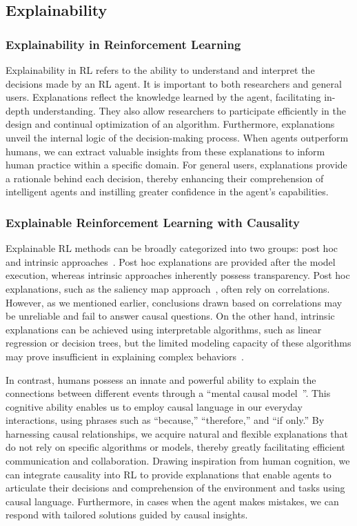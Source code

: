 \documentclass[10pt]{article} %
\theoremstyle{definition}
\begin{document}
\subsection{Explainability}
\subsubsection{Explainability in Reinforcement Learning}
Explainability in RL refers to the ability to understand and interpret the decisions made by an RL agent. It is important to both researchers and general users. Explanations reflect the knowledge learned by the agent, facilitating in-depth understanding. They also allow researchers to participate efficiently in the design and continual optimization of an algorithm. Furthermore, explanations unveil the internal logic of the decision-making process. When agents outperform humans, we can extract valuable insights from these explanations to inform human practice within a specific domain. For general users, explanations provide a rationale behind each decision, thereby enhancing their comprehension of intelligent agents and instilling greater confidence in the agent's capabilities.

\subsubsection{Explainable Reinforcement Learning with Causality}
Explainable RL methods can be broadly categorized into two groups: post hoc and intrinsic approaches~\citep{puiuttaExplainableReinforcementLearning2020, heuilletExplainabilityDeepReinforcement2021}. Post hoc explanations are provided after the model execution, whereas intrinsic approaches inherently possess transparency. Post hoc explanations, such as the saliency map approach~\citep{greydanusVisualizingUnderstandingAtari2018, mottInterpretableReinforcementLearning2019},  often rely on correlations. However, as we mentioned earlier, conclusions drawn based on correlations may be unreliable and fail to answer causal questions. On the other hand, intrinsic explanations can be achieved using interpretable algorithms, such as linear regression or decision trees, but the limited modeling capacity of these algorithms may prove insufficient in explaining complex behaviors~\citep{puiuttaExplainableReinforcementLearning2020}.

In contrast, humans possess an innate and powerful ability to explain the connections between different events through a ``mental causal model~\citep{slomanCausalModelsHow2005}''. This cognitive ability enables us to employ causal language in our everyday interactions, using phrases such as ``because,'' ``therefore,'' and ``if only.'' By harnessing causal relationships, we acquire natural and flexible explanations that do not rely on specific algorithms or models, thereby greatly facilitating efficient communication and collaboration. Drawing inspiration from human cognition, we can integrate causality into RL to provide explanations that enable agents to articulate their decisions and comprehension of the environment and tasks using causal language. Furthermore, in cases when the agent makes mistakes, we can respond with tailored solutions guided by causal insights.
\end{document}
